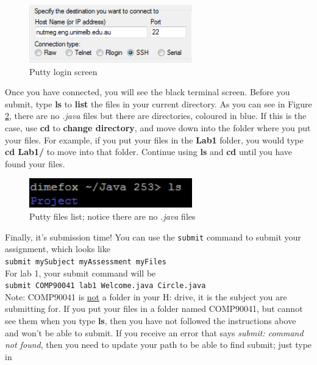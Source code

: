 \documentclass[]{article}
\begin{document}
\begin{figure}[!h]
	\centering
	\includegraphics[width=200pt]{Images/Putty}
	\caption{Putty login screen}
	\label{fig:Putty}
\end{figure}

Once you have connected, you will see the black terminal screen. Before you submit, type \textbf{ls} to \textbf{list} the files in your current directory. As you can see in Figure \ref{fig:ls}, there are no \textit{.java} files but there are directories, coloured in blue. If this is the case, use \textbf{cd} to \textbf{change directory}, and move down into the folder where you put your files. For example, if you put your files in the \textbf{Lab1} folder, you would type \textbf{cd Lab1/} to move into that folder. Continue using \textbf{ls} and \textbf{cd} until you have found your files.\\

\begin{figure}[!h]
	\centering
	\includegraphics[width=200pt]{Images/ls}
	\caption{Putty files list; notice there are no \textit{.java} files}
	\label{fig:ls}
\end{figure}

\newpage
Finally, it's submission time! You can use the \verb'submit' command to submit your assignment, which looks like\\

\verb'submit mySubject myAssessment myFiles'\\

For lab 1, your submit command will be\\

\verb'submit COMP90041 lab1 Welcome.java Circle.java'\\

Note: COMP90041 is \underline{not} a folder in your H: drive, it is the subject you are submitting for. If you put your files in a folder named COMP90041, but cannot see them when you type \textbf{ls}, then you have not followed the instructions above and won't be able to submit. If you receive an error that says \textit{submit: command not found}, then you need to update your path to be able to find submit; just type in
\end{document}
